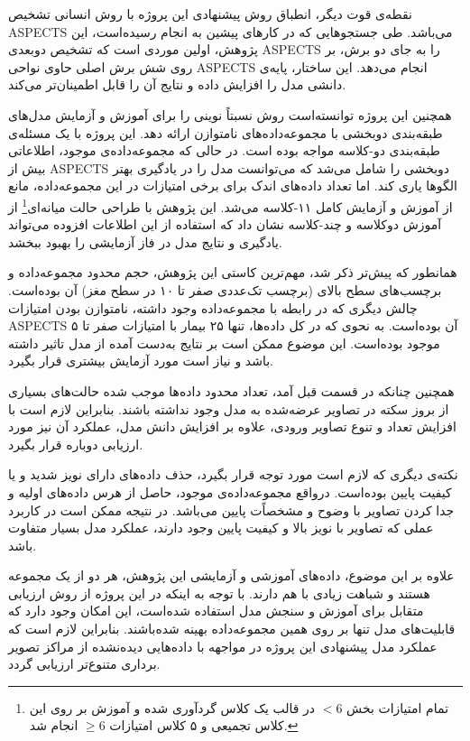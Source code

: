 نقطه‌ی قوت دیگر، انطباق روش پیشنهادی این پروژه با روش انسانی تشخیص ASPECTS می‌باشد.
طی جستجو‌هایی که در کارهای پیشین به انجام رسیده‌است،
این پژوهش، اولین موردی است که تشخیص دو‌بعدی ASPECTS را به جای دو برش، بر روی شش برش اصلی حاوی نواحی ASPECTS انجام می‌دهد.
این ساختار، پایه‌ی دانشی مدل را افزایش داده و نتایج آن را قابل اطمینان‌تر می‌کند.

همچنین این پروژه توانسته‌است روش نسبتاً نوینی را برای 
آموزش و آزمایش مدل‌های طبقه‌بندی دوبخشی با مجموعه‌داده‌‌های نامتوازن ارائه دهد.
 این پروژه با یک مسئله‌ی طبقه‌بندی دو-کلاسه مواجه بوده است.
 در حالی که مجموعه‌داده‌ی موجود، اطلاعاتی بیش از ASPECTS دوبخشی را شامل می‌شد
 که می‌توانست مدل را در یادگیری بهتر الگوها یاری کند.
 اما تعداد داده‌های اندک برای برخی امتیازات در این مجموعه‌داده، مانع از آموزش و آزمایش کامل ۱۱-کلاسه می‌شد.
 این پژوهش با 
 طراحی حالت میانه‌ای\footnote{تمام امتیازات بخش $<6$ در قالب یک کلاس گردآوری شده و آموزش بر روی این کلاس تجمیعی و ۵ کلاس امتیازات $\geq 6$ انجام شد.}
 از آموزش دو‌کلاسه و چند-کلاسه 
 نشان داد که استفاده از این اطلاعات افزوده می‌تواند 
 یادگیری و نتایج مدل در فاز آزمایشی را بهبود ببخشد.

همانطور که پیش‌تر ذکر شد، مهم‌ترین کاستی این پژوهش، حجم محدود مجموعه‌داده و برچسب‌های سطح بالای (برچسب تک‌عددی صفر تا ۱۰ در سطح مغز) آن بوده‌است.
چالش دیگری که در رابطه با مجموعه‌داده وجود داشته، نامتوازن بودن امتیازات ASPECTS آن بوده‌است.
به نحوی که در کل داده‌ها، تنها ۲۵ بیمار با امتیازات صفر تا ۵ موجود بوده‌است.
این موضوع ممکن است بر نتایج به‌دست آمده از مدل تاثیر داشته باشد و نیاز است مورد آزمایش بیشتری قرار بگیرد.

همچنین چنانکه در قسمت قبل آمد، تعداد محدود داده‌ها موجب شده حالت‌های بسیاری از بروز سکته در تصاویر عرضه‌شده به مدل وجود نداشته باشند.
بنابراین لازم است با افزایش تعداد و تنوع تصاویر ورودی، 
علاوه بر افزایش دانش مدل، عملکرد آن نیز مورد ارزیابی دوباره قرار بگیرد.

نکته‌ی دیگری که لازم است مورد توجه قرار بگیرد، حذف داده‌های دارای نویز شدید و یا کیفیت پایین بوده‌است.
درواقع مجموعه‌داده‌‌ی موجود، حاصل از هرس داده‌های اولیه و جدا کردن تصاویر با وضوح و مشخصاًت پایین می‌باشد.
در نتیجه ممکن است در کاربرد عملی که تصاویر با نویز بالا و کیفیت پایین وجود دارند، عملکرد مدل بسیار متفاوت باشد.

علاوه بر این موضوع، داده‌های آموزشی و آزمایشی
این پژوهش، هر دو از یک مجموعه هستند و شباهت زیادی با هم دارند.
با توجه به اینکه در این پروژه از روش ارزیابی متقابل برای آموزش و سنجش مدل استفاده شده‌است، این امکان وجود دارد که قابلیت‌های مدل تنها بر روی همین مجموعه‌داده بهینه شده‌باشند.
بنابراین لازم است که
عملکرد مدل پیشنهادی این پروژه در مواجهه با داده‌هایی دیده‌نشده از مراکز تصویر برداری متنوع‌تر ارزیابی گردد.

